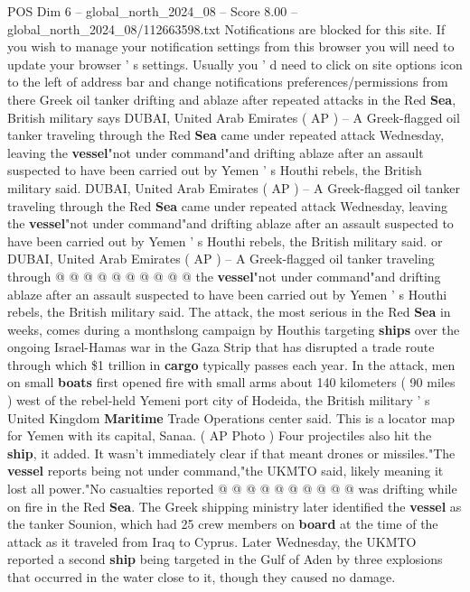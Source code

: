 \begin{textsample}{POS Dim 6 – global\_north\_2024\_08 – Score 8.00 – global\_north\_2024\_08/112663598.txt}  \label{ex:f6_pos_372}
Notifications are blocked for this site.
If you wish to manage your notification settings from this browser you will need to update your browser ' s settings.
Usually you ' d need to click on site options icon to the left of address bar and change notifications preferences/permissions from there Greek oil tanker drifting and ablaze after repeated attacks in the Red \textbf{Sea}, British military says DUBAI, United Arab Emirates ( AP ) -- A Greek-flagged oil tanker traveling through the Red \textbf{Sea} came under repeated attack Wednesday, leaving the \textbf{vessel}"not under command"and drifting ablaze after an assault suspected to have been carried out by Yemen ' s Houthi rebels, the British military said.
DUBAI, United Arab Emirates ( AP ) -- A Greek-flagged oil tanker traveling through the Red \textbf{Sea} came under repeated attack Wednesday, leaving the \textbf{vessel}"not under command"and drifting ablaze after an assault suspected to have been carried out by Yemen ' s Houthi rebels, the British military said. or DUBAI, United Arab Emirates ( AP ) -- A Greek-flagged oil tanker traveling through @ @ @ @ @ @ @ @ @ @ the \textbf{vessel}"not under command"and drifting ablaze after an assault suspected to have been carried out by Yemen ' s Houthi rebels, the British military said.
The attack, the most serious in the Red \textbf{Sea} in weeks, comes during a monthslong campaign by Houthis targeting \textbf{ships} over the ongoing Israel-Hamas war in the Gaza Strip that has disrupted a trade route through which \$1 trillion in \textbf{cargo} typically passes each year.
In the attack, men on small \textbf{boats} first opened fire with small arms about 140 kilometers ( 90 miles ) west of the rebel-held Yemeni port city of Hodeida, the British military ' s United Kingdom \textbf{Maritime} Trade Operations center said.
This is a locator map for Yemen with its capital, Sanaa. ( AP Photo ) Four projectiles also hit the \textbf{ship}, it added.
It wasn't immediately clear if that meant drones or missiles."The \textbf{vessel} reports being not under command,"the UKMTO said, likely meaning it lost all power."No casualties reported @ @ @ @ @ @ @ @ @ @ was drifting while on fire in the Red \textbf{Sea}.
The Greek shipping ministry later identified the \textbf{vessel} as the tanker Sounion, which had 25 crew members on \textbf{board} at the time of the attack as it traveled from Iraq to Cyprus.
Later Wednesday, the UKMTO reported a second \textbf{ship} being targeted in the Gulf of Aden by three explosions that occurred in the water close to it, though they caused no damage.

\end{textsample}
